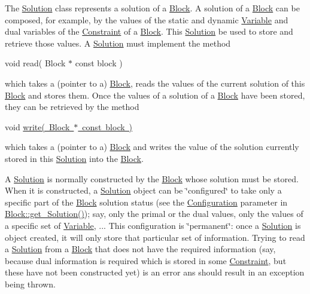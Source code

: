 The \mbox{\hyperlink{class_s_m_spp__di__unipi__it_1_1_solution}{Solution}} class represents a solution of a \mbox{\hyperlink{class_s_m_spp__di__unipi__it_1_1_block}{Block}}. A solution of a \mbox{\hyperlink{class_s_m_spp__di__unipi__it_1_1_block}{Block}} can be composed, for example, by the values of the static and dynamic \mbox{\hyperlink{class_s_m_spp__di__unipi__it_1_1_variable}{Variable}} and dual variables of the \mbox{\hyperlink{class_s_m_spp__di__unipi__it_1_1_constraint}{Constraint}} of a \mbox{\hyperlink{class_s_m_spp__di__unipi__it_1_1_block}{Block}}. This \mbox{\hyperlink{class_s_m_spp__di__unipi__it_1_1_solution}{Solution}} be used to store and retrieve those values. A \mbox{\hyperlink{class_s_m_spp__di__unipi__it_1_1_solution}{Solution}} must implement the method

void read( Block $\ast$ const block )

which takes a (pointer to a) \mbox{\hyperlink{class_s_m_spp__di__unipi__it_1_1_block}{Block}}, reads the values of the current solution of this \mbox{\hyperlink{class_s_m_spp__di__unipi__it_1_1_block}{Block}} and stores them. Once the values of a solution of a \mbox{\hyperlink{class_s_m_spp__di__unipi__it_1_1_block}{Block}} have been stored, they can be retrieved by the method

void \mbox{\hyperlink{class_s_m_spp__di__unipi__it_1_1_solution_a6ba3f1b8f44f35e6a56fc0795587f68a}{write( Block $\ast$ const block )}}

which takes a (pointer to a) \mbox{\hyperlink{class_s_m_spp__di__unipi__it_1_1_block}{Block}} and writes the value of the solution currently stored in this \mbox{\hyperlink{class_s_m_spp__di__unipi__it_1_1_solution}{Solution}} into the \mbox{\hyperlink{class_s_m_spp__di__unipi__it_1_1_block}{Block}}.

A \mbox{\hyperlink{class_s_m_spp__di__unipi__it_1_1_solution}{Solution}} is normally constructed by the \mbox{\hyperlink{class_s_m_spp__di__unipi__it_1_1_block}{Block}} whose solution must be stored. When it is constructed, a \mbox{\hyperlink{class_s_m_spp__di__unipi__it_1_1_solution}{Solution}} object can be \char`\"{}configured\char`\"{} to take only a specific part of the \mbox{\hyperlink{class_s_m_spp__di__unipi__it_1_1_block}{Block}} solution status (see the \mbox{\hyperlink{class_s_m_spp__di__unipi__it_1_1_configuration}{Configuration}} parameter in \mbox{\hyperlink{class_s_m_spp__di__unipi__it_1_1_block_a1db67c2f65111af4314e79dfc81ba597}{Block\+::get\+\_\+\+Solution()}}); say, only the primal or the dual values, only the values of a specific set of \mbox{\hyperlink{class_s_m_spp__di__unipi__it_1_1_variable}{Variable}}, ... This configuration is \char`\"{}permanent\char`\"{}\+: once a \mbox{\hyperlink{class_s_m_spp__di__unipi__it_1_1_solution}{Solution}} is object created, it will only store that particular set of information. Trying to read a \mbox{\hyperlink{class_s_m_spp__di__unipi__it_1_1_solution}{Solution}} from a \mbox{\hyperlink{class_s_m_spp__di__unipi__it_1_1_block}{Block}} that does not have the required information (say, because dual information is required which is stored in some \mbox{\hyperlink{class_s_m_spp__di__unipi__it_1_1_constraint}{Constraint}}, but these have not been constructed yet) is an error ans should result in an exception being thrown.

